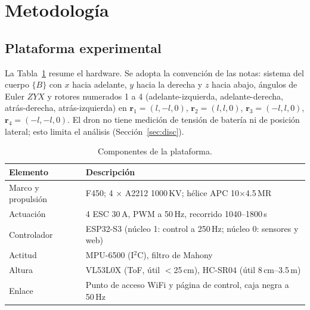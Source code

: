 \section{Metodología}
\label{sec:met}

\subsection{Plataforma experimental}
La Tabla~\ref{tab:hw} resume el hardware. Se adopta la convención de las notas: sistema del cuerpo $\{B\}$ con $x$ hacia adelante, $y$ hacia la derecha y $z$ hacia abajo, ángulos de Euler $ZYX$ y rotores numerados 1 a 4 (adelante-izquierda, adelante-derecha, atrás-derecha, atrás-izquierda) en $\bm r_1=(l,-l,0)$, $\bm r_2=(l,l,0)$, $\bm r_3=(-l,l,0)$, $\bm r_4=(-l,-l,0)$. El dron no tiene medición de tensión de batería ni de posición lateral; esto limita el análisis (Sección~\ref{sec:disc}).

\begin{table}[t]
\caption{Componentes de la plataforma.}
\label{tab:hw}
\centering\small
\begin{tabular}{@{}lp{5.7cm}@{}}
\toprule
Elemento & Descripción \\
\midrule
Marco y propulsión & F450; 4 $\times$ A2212 1000\,KV; hélice APC 10$\times$4.5\,MR \\
Actuación & 4 ESC 30\,A, PWM a 50\,Hz, recorrido 1040--1800\,\textmu{}s \\
Controlador & ESP32-S3 (núcleo 1: control a 250\,Hz; núcleo 0: sensores y web) \\
Actitud & MPU-6500 (I$^2$C), filtro de Mahony \\
Altura & VL53L0X (ToF, útil $<$25\,cm), HC-SR04 (útil 8\,cm--3.5\,m) \\
Enlace & Punto de acceso WiFi y página de control, caja negra a 50\,Hz \\
\bottomrule
\end{tabular}
\end{table}

